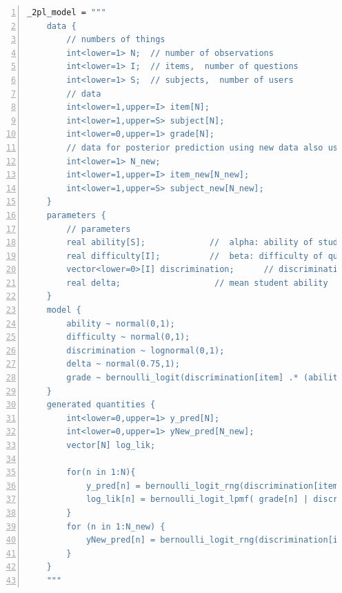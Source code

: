 \begin{lstlisting}[language=Stan,caption={Code Stan pour 2PL},basicstyle=\scriptsize, frame=lines,framesep=4.5mm,framexleftmargin=2.5mm,tabsize=2,numbers=left,fillcolor=\color{white},rulecolor=\color{black},numberstyle=\normalfont\scriptsize\color{black}]
    _2pl_model = """
    data {
        // numbers of things
        int<lower=1> N;  // number of observations
        int<lower=1> I;  // items,  number of questions  
        int<lower=1> S;  // subjects,  number of users 
        // data
        int<lower=1,upper=I> item[N];
        int<lower=1,upper=S> subject[N];
        int<lower=0,upper=1> grade[N];
        // data for posterior prediction using new data also used for Cross-validation
        int<lower=1> N_new;
        int<lower=1,upper=I> item_new[N_new];
        int<lower=1,upper=S> subject_new[N_new];
    }
    parameters {
        // parameters
        real ability[S];             //  alpha: ability of student
        real difficulty[I];          //  beta: difficulty of question
        vector<lower=0>[I] discrimination;      // discrimination of question
        real delta;                   // mean student ability
    }
    model {
        ability ~ normal(0,1);         
        difficulty ~ normal(0,1);   
        discrimination ~ lognormal(0,1);
        delta ~ normal(0.75,1);
        grade ~ bernoulli_logit(discrimination[item] .* (ability[subject] - (difficulty[item] + delta)));	
    }
    generated quantities {
        int<lower=0,upper=1> y_pred[N];
        int<lower=0,upper=1> yNew_pred[N_new];
        vector[N] log_lik;

        for(n in 1:N){
            y_pred[n] = bernoulli_logit_rng(discrimination[item[n]] * (ability[subject[n]] - (difficulty[item[n]] + delta)));
            log_lik[n] = bernoulli_logit_lpmf( grade[n] | discrimination[item[n]] * (ability[subject[n]] - (difficulty[item[n]] + delta)));
        }
        for (n in 1:N_new) {
            yNew_pred[n] = bernoulli_logit_rng(discrimination[item[n]] * (ability[subject_new[n]] - (difficulty[item_new[n]] + delta)));                             
        }
    }
    """
\end{lstlisting}

\newpage

